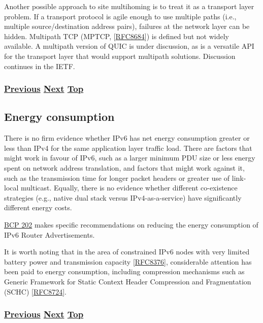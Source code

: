 \documentclass[
]{article}
\begin{document}
Another possible approach to site multihoming is to treat it as a
transport layer problem. If a transport protocol is agile enough to use
multiple paths (i.e., multiple source/destination address pairs),
failures at the network layer can be hidden. Multipath TCP (MPTCP,
{[}\href{https://www.rfc-editor.org/info/rfc8684}{RFC8684}{]}) is
defined but not widely available. A multipath version of QUIC is under
discussion, as is a versatile API for the transport layer that would
support multipath solutions. Discussion continues in the IETF.

\subsubsection{\texorpdfstring{\hyperref[multi-prefix-operation]{Previous}
\hyperref[energy-consumption]{Next}
\hyperref[management-and-operations]{Top}}{Previous Next Top}}\label{previous-next-top-31}

\pagebreak

\subsection{Energy consumption}\label{energy-consumption}

There is no firm evidence whether IPv6 has net energy consumption
greater or less than IPv4 for the same application layer traffic load.
There are factors that might work in favour of IPv6, such as a larger
minimum PDU size or less energy spent on network address translation,
and factors that might work against it, such as the transmission time
for longer packet headers or greater use of link-local multicast.
Equally, there is no evidence whether different co-existence strategies
(e.g., native dual stack versus IPv4-as-a-service) have significantly
different energy costs.

\href{https://www.rfc-editor.org/info/bcp202}{BCP 202} makes specific
recommendations on reducing the energy consumption of IPv6 Router
Advertisements.

It is worth noting that in the area of constrained IPv6 nodes with very
limited battery power and transmission capacity
{[}\href{https://www.rfc-editor.org/info/rfc8376}{RFC8376}{]},
considerable attention has been paid to energy consumption, including
compression mechanisms such as Generic Framework for Static Context
Header Compression and Fragmentation (SCHC)
{[}\href{https://www.rfc-editor.org/info/rfc8724}{RFC8724}{]}.

\subsubsection{\texorpdfstring{\hyperref[multihoming]{Previous}
\hyperref[packet-size-and-jumbo-frames]{Next}
\hyperref[management-and-operations]{Top}}{Previous Next Top}}\label{previous-next-top-32}
\end{document}
